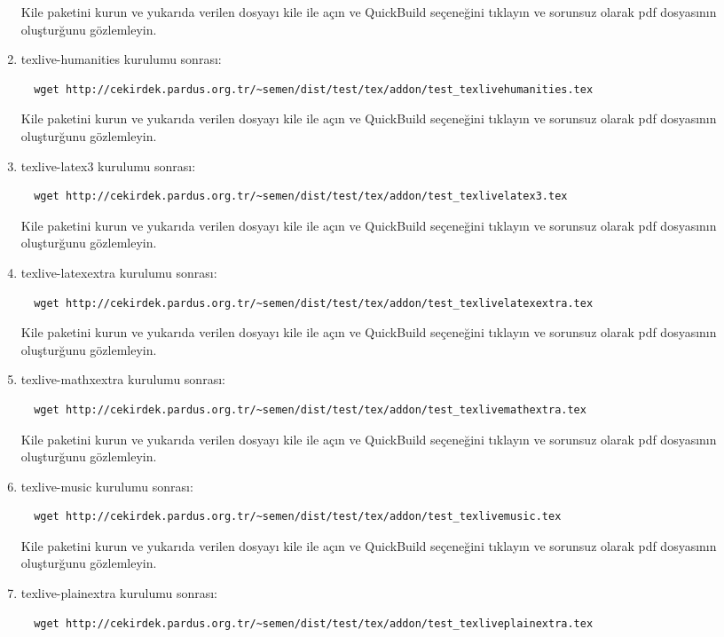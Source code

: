 \documentclass[a4paper,10pt]{article}
\begin{document}
\begin{enumerate}
Kile paketini kurun ve yukarıda verilen dosyayı kile ile açın ve QuickBuild  seçeneğini tıklayın ve sorunsuz olarak pdf dosyasının oluşturğunu gözlemleyin.

\item texlive-humanities kurulumu sonrası:
\begin{verbatim}
  wget http://cekirdek.pardus.org.tr/~semen/dist/test/tex/addon/test_texlivehumanities.tex
\end{verbatim}

Kile paketini kurun ve yukarıda verilen dosyayı kile ile açın ve QuickBuild  seçeneğini tıklayın ve sorunsuz olarak pdf dosyasının oluşturğunu gözlemleyin.

\item texlive-latex3 kurulumu sonrası:
\begin{verbatim}
  wget http://cekirdek.pardus.org.tr/~semen/dist/test/tex/addon/test_texlivelatex3.tex
\end{verbatim}

Kile paketini kurun ve yukarıda verilen dosyayı kile ile açın ve QuickBuild  seçeneğini tıklayın ve sorunsuz olarak pdf dosyasının oluşturğunu gözlemleyin.
\item texlive-latexextra kurulumu sonrası:
\begin{verbatim}
  wget http://cekirdek.pardus.org.tr/~semen/dist/test/tex/addon/test_texlivelatexextra.tex
\end{verbatim}

Kile paketini kurun ve yukarıda verilen dosyayı kile ile açın ve QuickBuild  seçeneğini tıklayın ve sorunsuz olarak pdf dosyasının oluşturğunu gözlemleyin.
\item texlive-mathxextra kurulumu sonrası:
\begin{verbatim}
  wget http://cekirdek.pardus.org.tr/~semen/dist/test/tex/addon/test_texlivemathextra.tex
\end{verbatim}

Kile paketini kurun ve yukarıda verilen dosyayı kile ile açın ve QuickBuild  seçeneğini tıklayın ve sorunsuz olarak pdf dosyasının oluşturğunu gözlemleyin.

\item texlive-music kurulumu sonrası:
\begin{verbatim}
  wget http://cekirdek.pardus.org.tr/~semen/dist/test/tex/addon/test_texlivemusic.tex
\end{verbatim}

Kile paketini kurun ve yukarıda verilen dosyayı kile ile açın ve QuickBuild  seçeneğini tıklayın ve sorunsuz olarak pdf dosyasının oluşturğunu gözlemleyin.
\item texlive-plainextra kurulumu sonrası:
\begin{verbatim}
  wget http://cekirdek.pardus.org.tr/~semen/dist/test/tex/addon/test_texliveplainextra.tex
\end{verbatim}


\end{enumerate}
\end{document}
